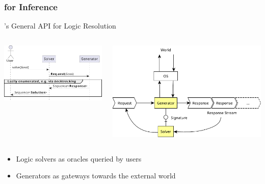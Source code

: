 \documentclass[presentation]{beamer}\mode<presentation>{\usetheme{AMSBolognaFC}}
\begin{document}
\subsubsection{\twopkt{} for Inference}

\begin{frame}{\twopkt{}'s General API for Logic Resolution}

    \begin{columns}
        \begin{column}{.49\linewidth}
            \includegraphics[width=\linewidth]{figures/primitive-usage.pdf}
        \end{column}
        \begin{column}{.49\linewidth}
            \includegraphics[width=\linewidth]{figures/generator.pdf}
        \end{column}
    \end{columns}

    \vfill

    \begin{itemize}
        \item Logic solvers as \alert{oracles} queried by users
        
        \vfill

        \item Generators as \alert{gateways} towards the external world
    \end{itemize}
\end{frame}
\end{document}
